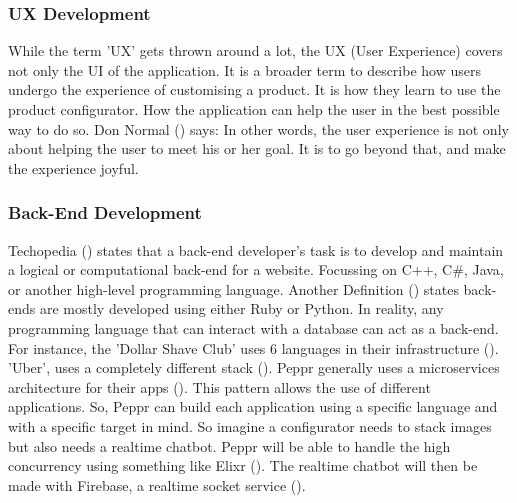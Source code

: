 \subsubsection{UX Development}
While the term 'UX' gets thrown around a lot, the UX (User Experience) covers not only the UI of the application. It is a broader term to describe how users undergo the experience of customising a product. It is how they learn to use the product configurator. How the application can help the user in the best possible way to do so. Don Normal (\cite{userExperience}) says: \newline
{} \newline
In other words, the user experience is not only about helping the user to meet his or her goal. It is to go beyond that, and make the experience joyful.

\subsubsection{Back-End Development}
Techopedia (\cite{backendDevDefinition}) states that a back-end developer's task is to develop and maintain a logical or computational back-end for a website. Focussing on C++, C\#, Java, or another high-level programming language. Another Definition (\cite{backendDevDefinition}) states back-ends are mostly developed using either Ruby or Python.
In reality, any programming language that can interact with a database can act as a back-end. For instance, the 'Dollar Shave Club' uses 6 languages in their infrastructure (\cite{dollarShaveClubBackEnd}). 'Uber', uses a completely different stack (\cite{uberBackEnd}).
Peppr generally uses a microservices architecture for their apps (\cite{microservices}). This pattern allows the use of different applications. So, Peppr can build each application using a specific language and with a specific target in mind. So imagine a configurator needs to stack images but also needs a realtime chatbot. Peppr will be able to handle the high concurrency using something like Elixr (\cite{elixr}). The realtime chatbot will then be made with Firebase, a realtime socket service (\cite{firebase}).

